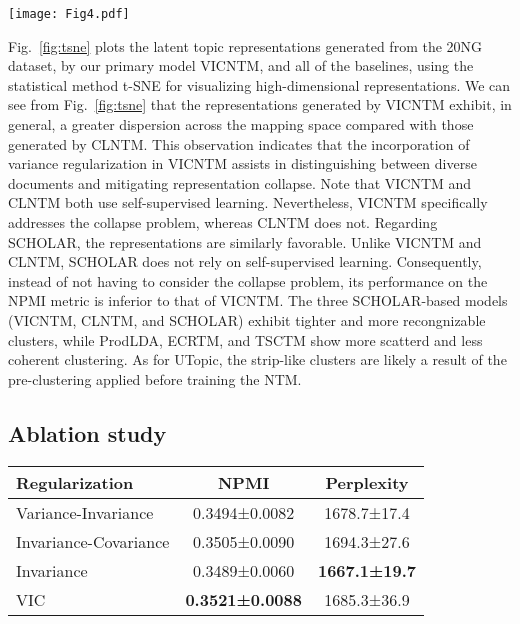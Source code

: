 \documentclass{article}
\begin{document}
\begin{figure*}[ht]
    \centering
    \texttt{[image: Fig4.pdf]}
    \caption{{\bf t-SNE plots of latent topic representations on the 20NG dataset}} \label{fig:tsne}
\end{figure*}
Fig.~\ref{fig:tsne} plots the latent topic representations generated from the 20NG dataset, by our primary model VICNTM, and all of the baselines, using the statistical method t-SNE for visualizing high-dimensional representations. 
We can see from Fig.~\ref{fig:tsne} that the representations generated by VICNTM exhibit, in general, a greater dispersion across the mapping space compared with those generated by CLNTM. 
This observation indicates that the incorporation of variance regularization in VICNTM assists in distinguishing between diverse documents and mitigating representation collapse. 
Note that VICNTM and CLNTM both use self-supervised learning. 
Nevertheless, VICNTM specifically addresses the collapse problem, whereas CLNTM does not.
Regarding SCHOLAR, the representations are similarly favorable. 
Unlike VICNTM and CLNTM, SCHOLAR does not rely on self-supervised learning. 
Consequently, instead of not having to consider the collapse problem, its performance on the NPMI metric is inferior to that of VICNTM.
The three SCHOLAR-based models (VICNTM, CLNTM, and SCHOLAR) exhibit tighter and more recongnizable clusters, while ProdLDA, ECRTM, and TSCTM show more scatterd and less coherent clustering. As for UTopic, the strip-like clusters are likely a result of the pre-clustering applied before training the NTM.

\subsection{Ablation study}\label{sec45}
\begin{table*}[ht]
\caption{Ablation study using 20NG data when $k=50$}\label{tab:ablation}
\begin{tabular*}{\textwidth}{@{\extracolsep\fill}lcc}
\toprule
Regularization & NPMI                   & Perplexity           \\ \midrule
Variance-Invariance                & 0.3494±0.0082          & 1678.7±17.4          \\
Invariance-Covariance              & 0.3505±0.0090          & 1694.3±27.6          \\
Invariance                         & 0.3489±0.0060          & \textbf{1667.1±19.7} \\ \midrule
VIC                                & \textbf{0.3521±0.0088} & 1685.3±36.9          \\ \bottomrule
\end{tabular*}
\end{table*}
\end{document}
